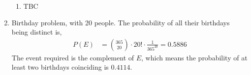 \begin{enumerate}
\begin{enumerate}
              \item TBC
          \end{enumerate}

    \item Birthday problem, with 20 people. The probability of all their birthdays being
          distinct is,
          \begin{align}
              P(E) & = \binom{365}{20} \cdot 20! \cdot \frac{1}{365^{20}} = 0.5886
          \end{align}
          The event required is the complement of $ E $, which means the probability of
          at least two birthdays coinciding is $ 0.4114 $.
\end{enumerate}